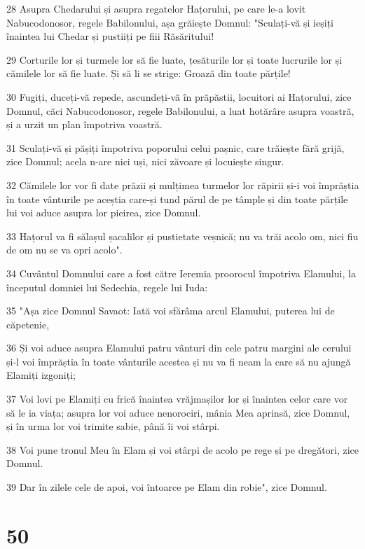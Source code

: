 \par 28 Asupra Chedarului și asupra regatelor Hațorului, pe care le-a lovit Nabucodonosor, regele Babilonului, așa grăiește Domnul: "Sculați-vă și ieșiți înaintea lui Chedar și pustiiți pe fiii Răsăritului!
\par 29 Corturile lor și turmele lor să fie luate, țesăturile lor și toate lucrurile lor și cămilele lor să fie luate. Și să li se strige: Groază din toate părțile!
\par 30 Fugiți, duceți-vă repede, ascundeți-vă în prăpăstii, locuitori ai Hațorului, zice Domnul, căci Nabucodonosor, regele Babilonului, a luat hotărâre asupra voastră, și a urzit un plan împotriva voastră.
\par 31 Sculați-vă și pășiți împotriva poporului celui pașnic, care trăiește fără grijă, zice Domnul; acela n-are nici uși, nici zăvoare și locuiește singur.
\par 32 Cămilele lor vor fi date prăzii și mulțimea turmelor lor răpirii și-i voi împrăștia în toate vânturile pe aceștia care-și tund părul de pe tâmple și din toate părțile lui voi aduce asupra lor pieirea, zice Domnul.
\par 33 Hațorul va fi sălașul șacalilor și pustietate veșnică; nu va trăi acolo om, nici fiu de om nu se va opri acolo".
\par 34 Cuvântul Domnului care a fost către Ieremia proorocul împotriva Elamului, la începutul domniei lui Sedechia, regele lui Iuda:
\par 35 "Așa zice Domnul Savaot: Iată voi sfărâma arcul Elamului, puterea lui de căpetenie,
\par 36 Și voi aduce asupra Elamului patru vânturi din cele patru margini ale cerului și-l voi împrăștia în toate vânturile acestea și nu va fi neam la care să nu ajungă Elamiți izgoniți;
\par 37 Voi lovi pe Elamiți cu frică înaintea vrăjmașilor lor și înaintea celor care vor să le ia viața; asupra lor voi aduce nenorociri, mânia Mea aprinsă, zice Domnul, și în urma lor voi trimite sabie, până îi voi stârpi.
\par 38 Voi pune tronul Meu în Elam și voi stârpi de acolo pe rege și pe dregători, zice Domnul.
\par 39 Dar în zilele cele de apoi, voi întoarce pe Elam din robie", zice Domnul.

\chapter{50}

